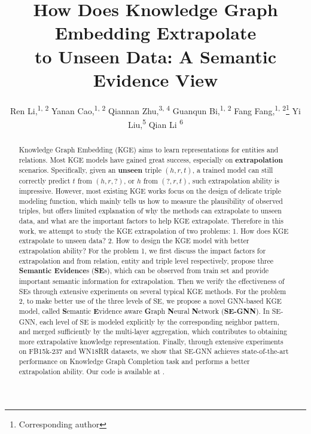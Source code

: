 \documentclass[letterpaper]{article} \usepackage{aaai22}  \usepackage{times}  \usepackage{helvet}  \usepackage{courier}  \usepackage[hyphens]{url}  \usepackage{graphicx} \urlstyle{rm} \def\UrlFont{\rm}  \usepackage{natbib}  \usepackage{caption} \DeclareCaptionStyle{ruled}{labelfont=normalfont,labelsep=colon,strut=off} \frenchspacing  \setlength{\pdfpagewidth}{8.5in}  \setlength{\pdfpageheight}{11in}  \usepackage{algorithm}
\title{How Does Knowledge Graph Embedding Extrapolate\\ to Unseen Data: A Semantic Evidence View}
\author{
    Ren Li,\textsuperscript{\rm 1, 2} 
    Yanan Cao,\textsuperscript{\rm 1, 2} 
    Qiannan Zhu,\textsuperscript{\rm 3, 4} 
    Guanqun Bi,\textsuperscript{\rm 1, 2}
    Fang Fang,\textsuperscript{\rm 1, 2}\thanks{Corresponding author}
    Yi Liu,\textsuperscript{\rm 5}
    Qian Li \textsuperscript{\rm 6}
}
\begin{document}
\maketitle

\begin{abstract}
Knowledge Graph Embedding (KGE) aims to learn representations for entities and relations. 
Most KGE models have gained great success, especially on \textbf{extrapolation} scenarios. Specifically, given an \textbf{unseen} triple $(h, r, t)$, a trained model can still correctly predict $t$ from $(h, r, ?)$, or $h$ from $(?, r, t)$, such extrapolation ability is impressive.
However, most existing KGE works focus on the design of delicate triple modeling function, which mainly tells us how to measure the plausibility of observed triples, but offers limited explanation of why the methods can extrapolate to unseen data, and what are the important factors to help KGE extrapolate. 
Therefore in this work, we attempt to study the KGE extrapolation of two problems: 1. How does KGE extrapolate to unseen data? 2. How to design the KGE model with better extrapolation ability? 
For the problem 1, we first discuss the impact factors for extrapolation and from relation, entity and triple level respectively, propose three \textbf{Semantic Evidence}s (\textbf{SE}s), which can be observed from train set and provide important semantic information for extrapolation. Then we verify the effectiveness of SEs through extensive experiments on several typical KGE methods.
For the problem 2, to make better use of the three levels of SE, we propose a novel GNN-based KGE model, called \textbf{S}emantic \textbf{E}vidence aware \textbf{G}raph \textbf{N}eural \textbf{N}etwork (\textbf{SE-GNN}). In SE-GNN, each level of SE is modeled explicitly by the corresponding neighbor pattern, and merged sufficiently by the multi-layer aggregation, which contributes to obtaining more extrapolative knowledge representation. 
Finally, through extensive experiments on FB15k-237 and WN18RR datasets, we show that SE-GNN achieves state-of-the-art performance on Knowledge Graph Completion task and performs a better extrapolation ability. Our code is available at .
\end{abstract}
\end{document}
